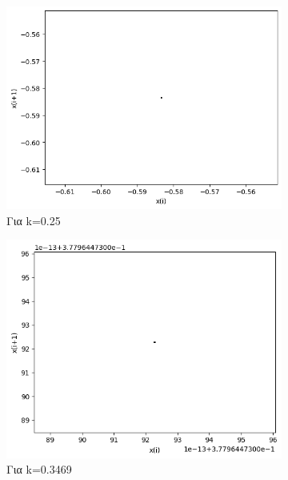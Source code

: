 \begin{figure}[h!]
	\centering
	
	\begin{subfigure}[b]{0.4\textwidth}
		\centering
		\includegraphics[width=\textwidth]{LateX images/graphs q07/g3}
		\caption{Για k=0.25}
		\label{f:k37}
	\end{subfigure}
	\hfill
	\begin{subfigure}[b]{0.4\textwidth}
		\centering
		\includegraphics[width=\textwidth]{LateX images/graphs q07/g4}
		\caption{Για k=0.3469}
		\label{f:k38}
	\end{subfigure}
	\hfill
	\begin{subfigure}[b]{0.4\textwidth}

\end{subfigure}
\end{figure}
